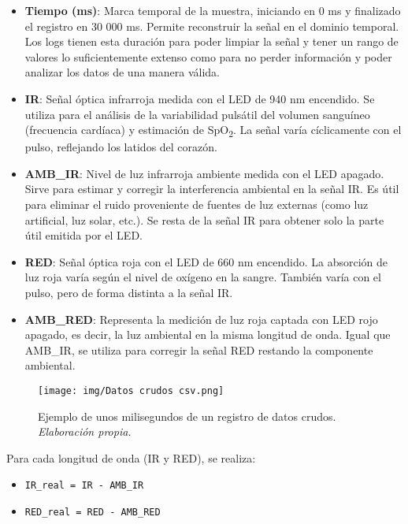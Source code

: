 \begin{itemize}
  \item \textbf{Tiempo (ms)}: Marca temporal de la muestra, iniciando en 0 ms y finalizado el registro en 30 000 ms. Permite reconstruir la señal en el dominio temporal. Los logs tienen esta duración para poder limpiar la señal y tener un rango de valores lo suficientemente extenso como para no perder información y poder analizar los datos de una manera válida.
  
  \item \textbf{IR}: Señal óptica infrarroja medida con el LED de 940 nm encendido. Se utiliza para el análisis de la variabilidad pulsátil del volumen sanguíneo (frecuencia cardíaca) y estimación de SpO\textsubscript{2}. La señal varía cíclicamente con el pulso, reflejando los latidos del corazón.
  
  \item \textbf{AMB\_IR}: Nivel de luz infrarroja ambiente medida con el LED apagado.  Sirve para estimar y corregir la interferencia ambiental en la señal IR. Es útil para eliminar el ruido proveniente de fuentes de luz externas (como luz artificial, luz solar, etc.). Se resta de la señal IR para obtener solo la parte útil emitida por el LED.
  
  \item \textbf{RED}: Señal óptica roja con el LED de 660 nm encendido. La absorción de luz roja varía según el nivel de oxígeno en la sangre. También varía con el pulso, pero de forma distinta a la señal IR.
  
  \item \textbf{AMB\_RED}: Representa la medición de luz roja captada con LED rojo apagado, es decir, la luz ambiental en la misma longitud de onda. Igual que AMB\_IR, se utiliza para corregir la señal RED restando la componente ambiental.

\end{itemize}

\begin{figure}[H]
    \centering
    \texttt{[image: img/Datos crudos csv.png]}
    \caption{Ejemplo de unos milisegundos de un registro de datos crudos. \textit{Elaboración propia.}}
    \label{fig:datos_crudos}
\end{figure}

\newpage

Para cada longitud de onda (IR y RED), se realiza:
\begin{itemize}
    \item \texttt{IR\_real = IR - AMB\_IR}
    \item \texttt{RED\_real = RED - AMB\_RED}
\end{itemize}

